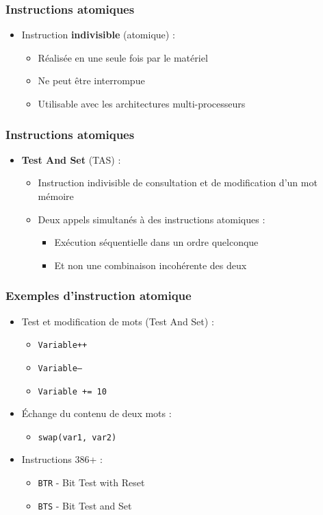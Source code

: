 \begin{frame}
\frametitle{Instructions atomiques}
\begin{itemize}
\item Instruction \textbf{indivisible} (atomique) :
\begin{itemize}
\item Réalisée en une seule fois par le matériel
\item Ne peut être interrompue
\item Utilisable avec les architectures multi-processeurs
\end{itemize}
\end{itemize}
\end{frame}

\begin{frame}
\frametitle{Instructions atomiques}
\begin{itemize}
\item \textbf{Test And Set} (TAS) :
\begin{itemize}
\item Instruction indivisible de consultation et de modification d'un mot mémoire
\item Deux appels simultanés à des instructions atomiques :
\begin{itemize}
\item Exécution séquentielle dans un ordre quelconque
\item Et non une combinaison incohérente des deux
\end{itemize}
\end{itemize}
\end{itemize}
\end{frame}

\begin{frame}
\frametitle{Exemples d’instruction atomique}
\begin{itemize}
\item <1-> Test et modification de mots
(Test And Set) :
\begin{itemize}
\item \texttt{Variable++}
\item \texttt{Variable--}
\item \texttt{Variable += 10}
\end{itemize}
\item <2-> Échange du contenu de deux mots :
\begin{itemize}
\item \texttt{swap(var1, var2)}
\end{itemize}
\item <3-> Instructions 386+ :
\begin{itemize}
\item \texttt{BTR} - Bit Test with Reset
\item \texttt{BTS} - Bit Test and Set
\end{itemize}
\end{itemize}
\end{frame}

